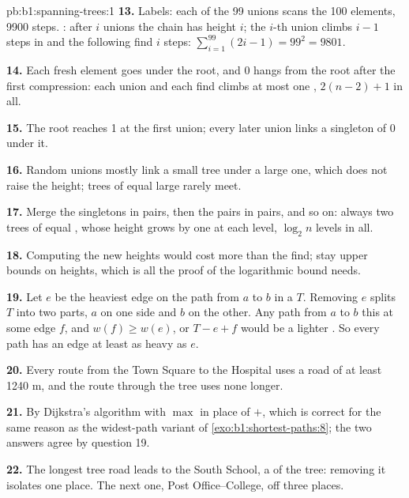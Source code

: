\begin{solution}{pb:b1:spanning-trees:1}
\textbf{13.} Labels: each of the 99 unions scans the 100 elements, 9900 steps. : after $i$ unions the chain has
height $i$; the $i$-th union climbs $i - 1$ steps in  and the following find $i$ steps:
$\sum_{i=1}^{99} (2i - 1) = 99^2 = 9801$.

\textbf{14.} Each fresh element goes under the root, and 0 hangs from the root after the first compression: each union
and each find climbs at most one , $2(n - 2) + 1$ in all.

\textbf{15.} The root reaches  1 at the first union; every later union links a singleton of  0 under it.

\textbf{16.} Random unions mostly link a small tree under a large one, which does not raise the height; trees of equal
large  rarely meet.

\textbf{17.} Merge the singletons in pairs, then the pairs in pairs, and so on: always two trees of equal , whose
height grows by one at each level, $\log_2 n$ levels in all.

\textbf{18.} Computing the new heights would cost more than the find;  stay upper bounds on heights, which is all
the proof of the logarithmic bound needs.

\textbf{19.} Let $e$ be the heaviest edge on the path from $a$ to $b$ in a  $T$. Removing $e$ splits
$T$ into two parts, $a$ on one side and $b$ on the other. Any path from $a$ to $b$  this  at some edge $f$, and
$w(f) \geq w(e)$, or $T - e + f$ would be a lighter . So every path has an edge at least as heavy as $e$.

\textbf{20.} Every route from the Town Square to the Hospital uses a road of at least 1240 m, and the route through the
tree uses none longer.

\textbf{21.} By Dijkstra's algorithm with $\max$ in place of $+$, which is correct for the same reason as the widest-path
variant of \cref{exo:b1:shortest-paths:8}; the two answers agree by question 19.

\textbf{22.} The longest tree road leads to the South School, a  of the tree: removing it isolates one place. The next
one, Post Office--College,  off three places.


\end{solution}

